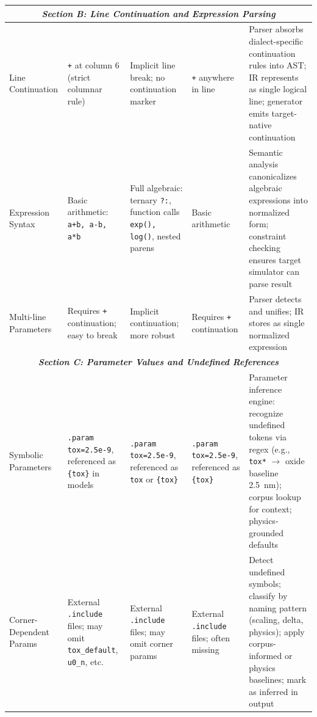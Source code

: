\begin{table}[!t]
\begin{tabular}{@{}p{2.2cm}p{2.8cm}p{2.8cm}p{2.8cm}p{3.8cm}@{}}
\midrule
\multicolumn{5}{c}{\textit{\textbf{Section B: Line Continuation and Expression Parsing}}} \\
\midrule

Line Continuation & \texttt{+} at column 6 \newline (strict columnar rule) & Implicit line break; \newline no continuation marker & \texttt{+} anywhere in line & Parser absorbs dialect-specific continuation rules into AST; IR represents as single logical line; generator emits target-native continuation \\

Expression Syntax & Basic arithmetic: \newline \texttt{a+b, a-b, a*b} & Full algebraic: ternary \texttt{?:}, function calls \texttt{exp(), log()}, nested parens & Basic arithmetic & Semantic analysis canonicalizes algebraic expressions into normalized form; constraint checking ensures target simulator can parse result \\

Multi-line Parameters & Requires \texttt{+} continuation; easy to break & Implicit continuation; more robust & Requires \texttt{+} continuation & Parser detects and unifies; IR stores as single normalized expression \\

\midrule
\multicolumn{5}{c}{\textit{\textbf{Section C: Parameter Values and Undefined References}}} \\
\midrule

Symbolic Parameters & \texttt{.param tox=2.5e-9}, \newline referenced as \texttt{\{tox\}} in models & \texttt{.param tox=2.5e-9}, \newline referenced as \texttt{tox} or \texttt{\{tox\}} & \texttt{.param tox=2.5e-9}, \newline referenced as \texttt{\{tox\}} & Parameter inference engine: recognize undefined tokens via regex (e.g., \texttt{tox*} $\rightarrow$ oxide baseline 2.5~nm); corpus lookup for context; physics-grounded defaults \\

Corner-Dependent Params & External \texttt{.include} files; may omit \texttt{tox\_default}, \texttt{u0\_n}, etc. & External \texttt{.include} files; may omit corner params & External \texttt{.include} files; often missing & Detect undefined symbols; classify by naming pattern (scaling, delta, physics); apply corpus-informed or physics baselines; mark as inferred in output \\


\end{tabular}
\end{table}
